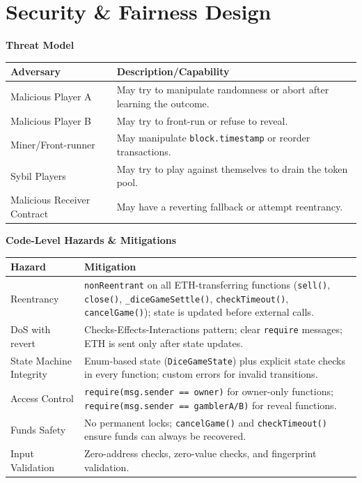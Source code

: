 \documentclass[10pt,a4paper]{article}
\begin{document}
\section{Security \& Fairness Design}
\begingroup
\small
\noindent\textbf{Threat Model}

\smallskip
\noindent\begin{tabularx}{\textwidth}{@{}>{\raggedright\arraybackslash}p{}X@{}}
\toprule
\textbf{Adversary} & \textbf{Description/Capability} \\
\midrule
Malicious Player A & May try to manipulate randomness or abort after learning the outcome. \\
Malicious Player B & May try to front-run or refuse to reveal. \\
Miner/Front-runner & May manipulate \texttt{block.timestamp} or reorder transactions. \\
Sybil Players & May try to play against themselves to drain the token pool. \\
Malicious Receiver Contract & May have a reverting fallback or attempt reentrancy. \\
\bottomrule
\end{tabularx}

\medskip
\noindent\textbf{Code-Level Hazards \& Mitigations}

\smallskip
\noindent\begin{tabularx}{\textwidth}{@{}>{\raggedright\arraybackslash}p{}X@{}}
\toprule
\textbf{Hazard} & \textbf{Mitigation} \\
\midrule
Reentrancy & \texttt{nonReentrant} on all ETH-transferring functions (\texttt{sell()}, \texttt{close()}, \texttt{\_diceGameSettle()}, \texttt{checkTimeout()}, \texttt{cancelGame()}); state is updated before external calls. \\
DoS with revert & Checks-Effects-Interactions pattern; clear \texttt{require} messages; ETH is sent only after state updates. \\
State Machine Integrity & Enum-based state (\texttt{DiceGameState}) plus explicit state checks in every function; custom errors for invalid transitions. \\
Access Control & \texttt{require(msg.sender == owner)} for owner-only functions; \texttt{require(msg.sender == gamblerA/B)} for reveal functions. \\
Funds Safety & No permanent locks; \texttt{cancelGame()} and \texttt{checkTimeout()} ensure funds can always be recovered. \\
Input Validation & Zero-address checks, zero-value checks, and fingerprint validation. \\
\bottomrule
\end{tabularx}
\end{document}
